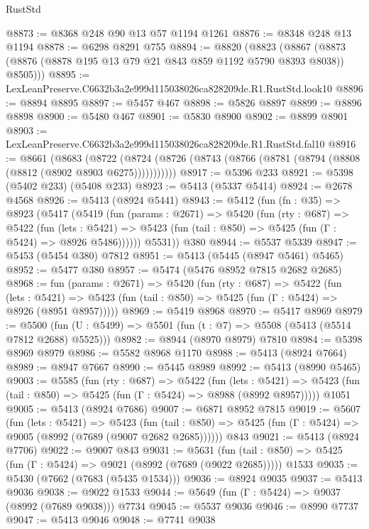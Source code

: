 \begin{lexlean}{RustStd}
\begin{coremodule}
@8873 := @8368 @248 @90 @13 @57 @1194 @1261
@8876 := @8348 @248 @13 @1194
@8878 := @6298 @8291 @755
@8894 := @8820
    (@8823 (@8867 (@8873 (@8876 (@8878 @195 @13 @79 @21 @843 @859 @1192 @5790 @8393 @8038)) @8505)))
@8895 := LexLeanPreserve.C6632b3a2e999d115038026ca828209de.R1.RustStd.look10
@8896 := @8894 @8895
@8897 := @5457 @467
@8898 := @5826 @8897
@8899 := @8896 @8898
@8900 := @5480 @467
@8901 := @5830 @8900
@8902 := @8899 @8901
@8903 := LexLeanPreserve.C6632b3a2e999d115038026ca828209de.R1.RustStd.fal10
@8916 := @8661
    (@8683
      (@8722 (@8724 (@8726 (@8743 (@8766 (@8781 (@8794 (@8808 (@8812 (@8902 @8903 @6275)))))))))))
@8917 := @5396 @233
@8921 := @5398 (@5402 @233) (@5408 @233)
@8923 := @5413 (@5337 @5414)
@8924 := @2678 @4568
@8926 := @5413 (@8924 @5441)
@8943 := @5412
    (fun (fn : @35) =>
    @8923
      (@5417
        (@5419
          (fun (params : @2671) =>
          @5420
            (fun (rty : @687) =>
            @5422
              (fun (lets : @5421) =>
              @5423 (fun (tail : @850) => @5425 (fun (Γ : @5424) => @8926 @5486))))))
        @5531))
    @380
@8944 := @5537 @5339
@8947 := @5453 (@5454 @380) @7812
@8951 := @5413 (@5445 (@8947 @5461) @5465)
@8952 := @5477 @380
@8957 := @5474 (@5476 @8952 @7815 @2682 @2685)
@8968 := fun (params : @2671) =>
  @5420
    (fun (rty : @687) =>
    @5422
      (fun (lets : @5421) =>
      @5423 (fun (tail : @850) => @5425 (fun (Γ : @5424) => @8926 (@8951 @8957)))))
@8969 := @5419 @8968
@8970 := @5417 @8969
@8979 := @5500 (fun (U : @5499) => @5501 (fun (t : @7) => @5508 (@5413 (@5514 @7812 @2688) @5525)))
@8982 := @8944 (@8970 @8979) @7810
@8984 := @5398 @8969 @8979
@8986 := @5582 @8968 @1170
@8988 := @5413 (@8924 @7664)
@8989 := @8947 @7667
@8990 := @5445 @8989
@8992 := @5413 (@8990 @5465)
@9003 := @5585
    (fun (rty : @687) =>
    @5422
      (fun (lets : @5421) =>
      @5423 (fun (tail : @850) => @5425 (fun (Γ : @5424) => @8988 (@8992 @8957)))))
    @1051
@9005 := @5413 (@8924 @7686)
@9007 := @6871 @8952 @7815
@9019 := @5607
    (fun (lets : @5421) =>
    @5423
      (fun (tail : @850) => @5425 (fun (Γ : @5424) => @9005 (@8992 (@7689 (@9007 @2682 @2685))))))
    @843
@9021 := @5413 (@8924 @7706)
@9022 := @9007 @843
@9031 := @5631
    (fun (tail : @850) => @5425 (fun (Γ : @5424) => @9021 (@8992 (@7689 (@9022 @2685)))))
    @1533
@9035 := @5430 (@7662 (@7683 (@5435 @1534)))
@9036 := @8924 @9035
@9037 := @5413 @9036
@9038 := @9022 @1533
@9044 := @5649 (fun (Γ : @5424) => @9037 (@8992 (@7689 @9038))) @7734
@9045 := @5537 @9036
@9046 := @8990 @7737
@9047 := @5413 @9046
@9048 := @7741 @9038

\end{coremodule}
\end{lexlean}
